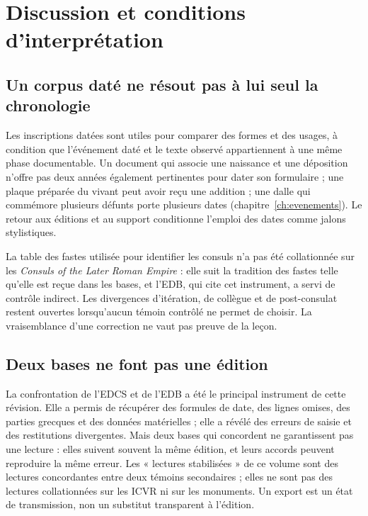 \chapter{Discussion et conditions d’interprétation}\label{ch:discussion}

\section{Un corpus daté ne résout pas à lui seul la chronologie}

Les inscriptions datées sont utiles pour comparer des formes et des usages, à condition que l’événement daté et le texte observé appartiennent à une même phase documentable. Un document qui associe une naissance et une déposition n’offre pas deux années également pertinentes pour dater son formulaire ; une plaque préparée du vivant peut avoir reçu une addition ; une dalle qui commémore plusieurs défunts porte plusieurs dates (chapitre~\ref{ch:evenements}). Le retour aux éditions et au support conditionne l’emploi des dates comme jalons stylistiques.

La table des fastes utilisée pour identifier les consuls n’a pas été collationnée sur les \emph{Consuls of the Later Roman Empire} : elle suit la tradition des fastes telle qu’elle est reçue dans les bases, et l’EDB, qui cite cet instrument, a servi de contrôle indirect. Les divergences d’itération, de collègue et de post-consulat restent ouvertes lorsqu’aucun témoin contrôlé ne permet de choisir. La vraisemblance d’une correction ne vaut pas preuve de la leçon.

\section{Deux bases ne font pas une édition}

La confrontation de l’EDCS et de l’EDB a été le principal instrument de cette révision. Elle a permis de récupérer des formules de date, des lignes omises, des parties grecques et des données matérielles ; elle a révélé des erreurs de saisie et des restitutions divergentes. Mais deux bases qui concordent ne garantissent pas une lecture : elles suivent souvent la même édition, et leurs accords peuvent reproduire la même erreur. Les « lectures stabilisées » de ce volume sont des lectures concordantes entre deux témoins secondaires ; elles ne sont pas des lectures collationnées sur les ICVR ni sur les monuments. Un export est un état de transmission, non un substitut transparent à l’édition.

